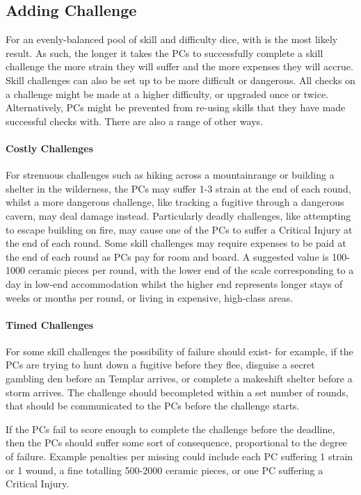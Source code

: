 \begin{multicols}{2}
\subsection{Adding Challenge}
For an evenly-balanced pool of skill and difficulty dice, \success with \triumph is the most likely result.
As such, the longer it takes the PCs to successfully complete a skill challenge the more strain they will
suffer and the more expenses they will accrue. Skill challenges can also be set up to be more difficult or
dangerous. All checks on a challenge might be made at a higher difficulty, or upgraded once or twice.
Alternatively, PCs might be prevented from re-using skills that they have made successful checks with. There
are also a range of other ways.

\paragraph{Costly Challenges}
For strenuous challenges such as hiking across a mountainrange or building a shelter in the wilderness,
the PCs may suffer 1-3 strain at the end of each round, whilst a more dangerous challenge, like tracking
a fugitive through a dangerous cavern, may deal damage instead. Particularly deadly challenges, like
attempting to escape building on fire, may cause one of the PCs to suffer a Critical Injury at the
end of each round. Some skill challenges may require expenses to be paid at the end of each round as PCs
pay for room and board. A suggested value is 100-1000 ceramic pieces per round, with the lower end of the
scale corresponding to a day in low-end accommodation whilst the higher end represents longer stays of
weeks or months per round, or living in expensive, high-class areas.

\paragraph{Timed Challenges}
For some skill challenges the possibility of failure should exist- for example, if the PCs are trying to
hunt down a fugitive before they flee, disguise a secret gambling den before an Templar arrives, or complete
a makeshift shelter before a storm arrives. The challenge should becompleted within a set number of rounds,
that should be communicated to the PCs before the challenge starts.

If the PCs fail to score enough \success to complete the challenge before the deadline, then the PCs should
suffer some sort of consequence, proportional to the degree of failure. Example penalties per missing \success
could include each PC suffering 1 strain or 1 wound, a fine totalling 500-2000 ceramic pieces, or one PC suffering
a Critical Injury.


\end{multicols}
